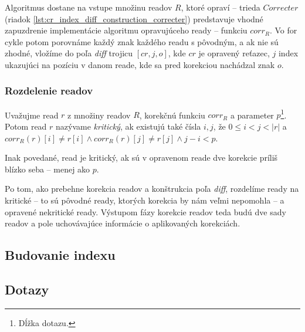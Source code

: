 Algoritmus dostane na vstupe množinu readov $R$, ktoré opraví -- trieda $Correcter$ (riadok \ref{lst:cr_index_diff_construction_correcter}) predstavuje vhodné zapuzdrenie implementácie algoritmu opravujúceho ready -- funkciu $corr_R$. Vo for cykle potom porovnáme každý znak každého readu s pôvodným, a ak nie sú zhodné, vložíme do poľa \emph{diff} trojicu $[cr, j, o]$, kde $cr$ je opravený reťazec, $j$ index ukazujúci na pozíciu v danom reade, kde sa pred korekciou nachádzal znak $o$.

\subsubsection{Rozdelenie readov}
\begin{defn}
Uvažujme read $r$ z množiny readov $R$, korekčnú funkciu $corr_R$ a parameter $p$\footnote{Dĺžka dotazu.}. Potom read $r$ nazývame \emph{kritický}, ak existujú také čísla $i, j$, že $0 \leq i < j < |r|$ a $corr_R(r)[i] \neq r[i] \wedge corr_R(r)[j] \neq r[j] \wedge j - i < p$.
\end{defn}

Inak povedané, read je kritický, ak sú v opravenom reade dve korekcie príliš blízko seba -- menej ako $p$.

Po tom, ako prebehne korekcia readov a konštrukcia poľa \emph{diff}, rozdelíme ready na kritické -- to sú pôvodné ready, ktorých korekcia by nám veľmi nepomohla -- a opravené nekritické ready. Výstupom fázy korekcie readov teda budú dve sady readov a pole uchovávajúce informácie o aplikovaných korekciách.

\subsection{Budovanie indexu}



\subsection{Dotazy}

